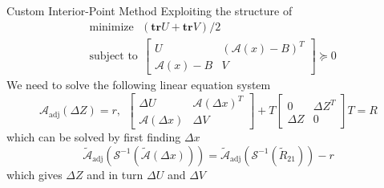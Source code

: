 \documentclass{beamer}
\newcommand{\mA}{\mathcal{A}}
\begin{document}
\begin{frame}{Custom Interior-Point Method}
Exploiting the structure of 
	\begin{equation}
	\begin{split}
		&\text{minimize}~~~(\mathbf{tr}U + \mathbf{tr}V)/2\\
		&\text{subject to}~~\begin{bmatrix}
		U & (\mA(x)-B)^T\\
		\mA(x) - B & V
		\end{bmatrix} \succeq 0
	\end{split}
	\end{equation}
We need to solve the following linear equation system
	\begin{equation}
	\mA_{\text{adj}}(\Delta Z) = r, ~~ \begin{bmatrix}
	\Delta U & \mA(\Delta x)^T\\
	\mA(\Delta x) & \Delta V
	\end{bmatrix}+ T \begin{bmatrix}
	0 & \Delta Z^T\\
	\Delta Z & 0
	\end{bmatrix}T = R
	\end{equation}
	which can be solved by first finding $ \Delta x $
	\begin{equation}
		\tilde{\mA}_\text{adj}(\mathcal{S}^{-1}(\tilde{\mA}(\Delta x)))=\tilde{\mA}_\text{adj}(\mathcal{S}^{-1}(\tilde{R}_{21})) -r
	\end{equation}
	which gives $ \Delta Z $ and in turn $ \Delta U $ and $ \Delta V $
\end{frame}
\end{document}
